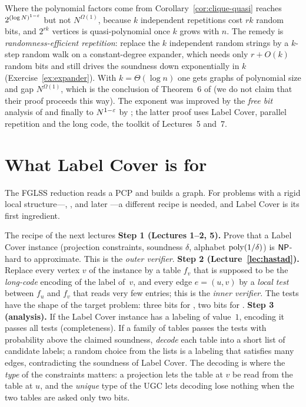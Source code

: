 \begin{bigpicture}{Where the polynomial factors come from}
Corollary~\ref{cor:clique-quasi} reaches $2^{(\log N)^{1-\varepsilon}}$ but not $N^{\Omega(1)}$, because $k$ independent repetitions cost $rk$ random bits, and $2^{rk}$ vertices is quasi-polynomial once $k$ grows with $n$.  The remedy is
\emph{randomness-efficient repetition}: replace the $k$ independent random strings by a $k$-step random walk on a constant-degree expander, which needs only $r+O(k)$ random bits and still drives the soundness down
exponentially in $k$ (Exercise~\ref{ex:expander}).  With $k=\Theta(\log n)$ one gets graphs of polynomial size and gap $N^{\Omega(1)}$, which is the conclusion of Theorem~6 of \citet{ALMSS98} (we do not claim that their proof proceeds this way).
The exponent was improved by the \emph{free bit} analysis of \citet{BGS98} and finally to $N^{1-\varepsilon}$ by \citet{Hastad99}; the latter proof uses Label Cover, parallel repetition and the long code, the toolkit of Lectures~5 and~7.
\end{bigpicture}


\section{What Label Cover is for}
\label{sec:for}

The FGLSS reduction reads a PCP and builds a graph.  For problems with a rigid local structure---, , and later ---a different recipe is needed, and Label Cover is its first ingredient.

\begin{bigpicture}{The recipe of the next lectures}
\textbf{Step 1 (Lectures 1--2, 5).}  Prove that a Label Cover instance (projection constraints, soundness $\delta$, alphabet $\operatorname{poly}(1/\delta)$) is $\mathsf{NP}$-hard to approximate.
This is the \emph{outer verifier}.
\textbf{Step 2 (Lecture~\ref{lec:hastad}).}  Replace every vertex $v$ of the instance by a table $f_v$ that is supposed to be the \emph{long-code} encoding of the label of~$v$, and every edge $e=(u,v)$ by a
\emph{local test} between $f_u$ and $f_v$ that reads very few entries; this is the \emph{inner verifier}.  The tests have the shape of the target problem: three bits for , two bits for .
\textbf{Step 3 (analysis).}  If the Label Cover instance has a labeling of value~$1$, encoding it passes all tests (completeness).  If a family of tables passes the tests with
probability above the claimed soundness, \emph{decode} each table into a short list of candidate labels; a random choice from the lists is a labeling that satisfies many edges, contradicting the soundness of
Label Cover.  The decoding is where the \emph{type} of the constraints matters: a projection lets the table at $v$ be read from the table at $u$, and the \emph{unique} type of the UGC lets decoding lose nothing
when the two tables are asked only two bits.
\end{bigpicture}

